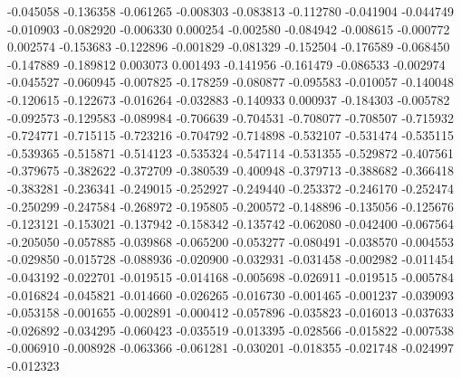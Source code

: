 -0.045058
-0.136358
-0.061265
-0.008303
-0.083813
-0.112780
-0.041904
-0.044749
-0.010903
-0.082920
-0.006330
0.000254
-0.002580
-0.084942
-0.008615
-0.000772
0.002574
-0.153683
-0.122896
-0.001829
-0.081329
-0.152504
-0.176589
-0.068450
-0.147889
-0.189812
0.003073
0.001493
-0.141956
-0.161479
-0.086533
-0.002974
-0.045527
-0.060945
-0.007825
-0.178259
-0.080877
-0.095583
-0.010057
-0.140048
-0.120615
-0.122673
-0.016264
-0.032883
-0.140933
0.000937
-0.184303
-0.005782
-0.092573
-0.129583
-0.089984
-0.706639
-0.704531
-0.708077
-0.708507
-0.715932
-0.724771
-0.715115
-0.723216
-0.704792
-0.714898
-0.532107
-0.531474
-0.535115
-0.539365
-0.515871
-0.514123
-0.535324
-0.547114
-0.531355
-0.529872
-0.407561
-0.379675
-0.382622
-0.372709
-0.380539
-0.400948
-0.379713
-0.388682
-0.366418
-0.383281
-0.236341
-0.249015
-0.252927
-0.249440
-0.253372
-0.246170
-0.252474
-0.250299
-0.247584
-0.268972
-0.195805
-0.200572
-0.148896
-0.135056
-0.125676
-0.123121
-0.153021
-0.137942
-0.158342
-0.135742
-0.062080
-0.042400
-0.067564
-0.205050
-0.057885
-0.039868
-0.065200
-0.053277
-0.080491
-0.038570
-0.004553
-0.029850
-0.015728
-0.088936
-0.020900
-0.032931
-0.031458
-0.002982
-0.011454
-0.043192
-0.022701
-0.019515
-0.014168
-0.005698
-0.026911
-0.019515
-0.005784
-0.016824
-0.045821
-0.014660
-0.026265
-0.016730
-0.001465
-0.001237
-0.039093
-0.053158
-0.001655
-0.002891
-0.000412
-0.057896
-0.035823
-0.016013
-0.037633
-0.026892
-0.034295
-0.060423
-0.035519
-0.013395
-0.028566
-0.015822
-0.007538
-0.006910
-0.008928
-0.063366
-0.061281
-0.030201
-0.018355
-0.021748
-0.024997
-0.012323
